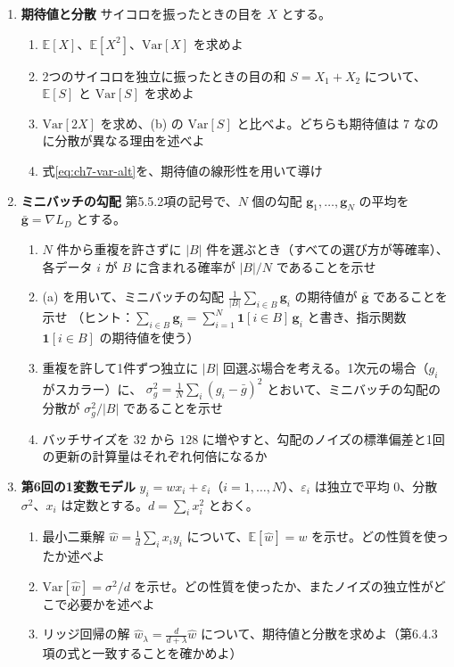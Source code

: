 \begin{enumerate}
  \item \textbf{期待値と分散}\quad
    サイコロを振ったときの目を $X$ とする。
    \begin{enumerate}
      \item $\mathbb{E}[X]$、$\mathbb{E}[X^2]$、$\mathrm{Var}[X]$ を求めよ
      \item 2つのサイコロを独立に振ったときの目の和 $S = X_1 + X_2$ について、$\mathbb{E}[S]$ と $\mathrm{Var}[S]$ を求めよ
      \item $\mathrm{Var}[2X]$ を求め、(b) の $\mathrm{Var}[S]$ と比べよ。どちらも期待値は $7$ なのに分散が異なる理由を述べよ
      \item 式\eqref{eq:ch7-var-alt}を、期待値の線形性を用いて導け
    \end{enumerate}

  \item \textbf{ミニバッチの勾配}\quad
    第5.5.2項の記号で、$N$ 個の勾配 $\bm{g}_1, \ldots, \bm{g}_N$ の平均を $\bar{\bm{g}} = \nabla L_D$ とする。
    \begin{enumerate}
      \item $N$ 件から重複を許さずに $|B|$ 件を選ぶとき（すべての選び方が等確率）、各データ $i$ が $B$ に含まれる確率が $|B|/N$ であることを示せ
      \item (a) を用いて、ミニバッチの勾配 $\frac{1}{|B|}\sum_{i \in B}\bm{g}_i$ の期待値が $\bar{\bm{g}}$ であることを示せ
        （ヒント：$\sum_{i \in B}\bm{g}_i = \sum_{i=1}^N \bm{1}[i \in B]\,\bm{g}_i$ と書き、指示関数 $\bm{1}[i \in B]$ の期待値を使う）
      \item 重複を許して1件ずつ独立に $|B|$ 回選ぶ場合を考える。1次元の場合（$g_i$ がスカラー）に、
        $\sigma_g^2 = \frac{1}{N}\sum_i (g_i - \bar{g})^2$ とおいて、ミニバッチの勾配の分散が $\sigma_g^2/|B|$ であることを示せ
      \item バッチサイズを $32$ から $128$ に増やすと、勾配のノイズの標準偏差と1回の更新の計算量はそれぞれ何倍になるか
    \end{enumerate}

  \item \textbf{第6回の1変数モデル}\quad
    $y_i = w x_i + \varepsilon_i$（$i = 1, \ldots, N$）、$\varepsilon_i$ は独立で平均 $0$、分散 $\sigma^2$、$x_i$ は定数とする。$d = \sum_i x_i^2$ とおく。
    \begin{enumerate}
      \item 最小二乗解 $\hat{w} = \frac{1}{d}\sum_i x_i y_i$ について、$\mathbb{E}[\hat{w}] = w$ を示せ。どの性質を使ったか述べよ
      \item $\mathrm{Var}[\hat{w}] = \sigma^2/d$ を示せ。どの性質を使ったか、またノイズの独立性がどこで必要かを述べよ
      \item リッジ回帰の解 $\hat{w}_\lambda = \frac{d}{d + \lambda}\hat{w}$ について、期待値と分散を求めよ（第6.4.3項の式と一致することを確かめよ）
    \end{enumerate}


\end{enumerate}
